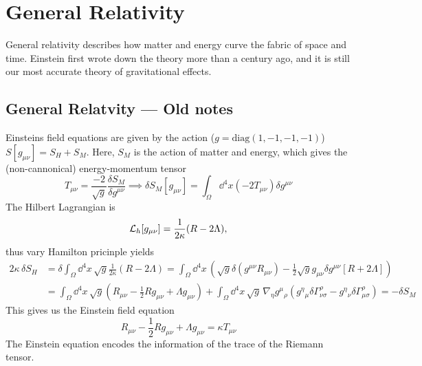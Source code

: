 \section{General Relativity}



General relativity describes how matter and energy curve the fabric of space and time.
Einstein first wrote down the theory more than a century ago, and it is still our most accurate theory of gravitational effects.




\subsection{General Relatvity --- Old notes}
Einsteins field equations are given by the action ($g = \mathrm{diag}(1, -1, -1, -1)$)$S[g_{\mu \nu}] = S_H + S_M.$
Here, $S_M$ is the action of matter and energy, which gives the (non-cannonical) energy-momentum tensor
\begin{equation*}
    T_{\mu \nu} = \frac{-2}{\sqrt{g}} \frac{\delta S_M}{\delta g^{\mu \nu}} \implies \delta S_M[g_{\mu \nu}] = \int_\Omega \dd^4x (-2 T_{\mu\nu})\delta g^{\mu \nu}
\end{equation*}
The Hilbert Lagrangian is
\begin{equation*}
    \mathcal L_h[g_{\mu \nu}] = \frac{1}{2\kappa} (R - 2\Lambda),
\end{equation*}
thus vary Hamilton pricinple yields
\begin{align*}
    2 \kappa \,\delta S_H 
    & = \delta \int_{\Omega} \dd^4 x \, \sqrt{g} \frac{1}{2 \kappa }\left(R - 2\Lambda\right) 
    = \int_{\Omega} \dd^4 x \,  \left( \sqrt{g}\delta (g^{\mu \nu} R_{\mu \nu})  - \frac{1}{2} \sqrt{g} g_{\mu \nu}\delta g^{\mu \nu} \left[R  + 2\Lambda \right]\right) \\
    & = \int_{\Omega} \dd^4 x \,\sqrt{g}  \left( R_{\mu \nu}  - \frac{1}{2} R g_{\mu \nu}  + \Lambda g_{\mu \nu}  \right) 
    + \int_{\Omega} \dd^4 x \,\sqrt{g}\,  \nabla_\eta g^\mu{}_\rho\left(  g^\eta{}_{\mu} \delta \Gamma^\rho_{\nu \sigma} - g^\eta{}_{\nu} \delta \Gamma^\rho_{\mu \sigma} \right) = - \delta S_M
\end{align*}
This gives us the Einstein field equation
\begin{equation*}
    R_{\mu \nu}  - \frac{1}{2} R g_{\mu \nu}  + \Lambda g_{\mu \nu}  = \kappa T_{\mu \nu}
\end{equation*}
The Einstein equation encodes the information of the trace of the Riemann tensor.
